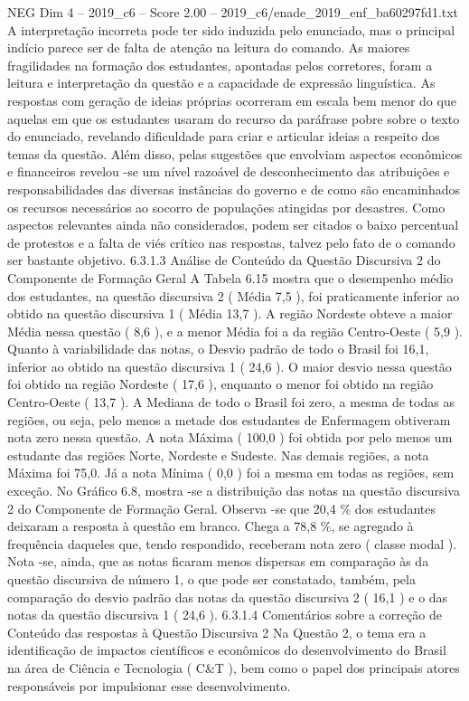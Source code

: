 \begin{textsample}{NEG Dim 4 – 2019\_c6 – Score 2.00 – 2019\_c6/enade\_2019\_enf\_ba60297fd1.txt}
A interpretação incorreta pode ter sido induzida pelo enunciado, mas o principal indício parece ser de falta de atenção na leitura do comando.
As maiores fragilidades na formação dos estudantes, apontadas pelos corretores, foram a leitura e interpretação da questão e a capacidade de expressão linguística.
As respostas com geração de ideias próprias ocorreram em escala bem menor do que aquelas em que os estudantes usaram do recurso da paráfrase pobre sobre o texto do enunciado, revelando dificuldade para criar e articular ideias a respeito dos temas da questão.
Além disso, pelas sugestões que envolviam aspectos econômicos e financeiros revelou -se um nível razoável de desconhecimento das atribuições e responsabilidades das diversas instâncias do governo e de como são encaminhados os recursos necessários ao socorro de populações atingidas por desastres.
Como aspectos relevantes ainda não considerados, podem ser citados o baixo percentual de protestos e a falta de viés crítico nas respostas, talvez pelo fato de o comando ser bastante objetivo. 6.3.1.3 Análise de Conteúdo da Questão Discursiva 2 do Componente de Formação Geral A Tabela 6.15 mostra que o desempenho médio dos estudantes, na questão discursiva 2 ( Média 7,5 ), foi praticamente inferior ao obtido na questão discursiva 1 ( Média 13,7 ).
A região Nordeste obteve a maior Média nessa questão ( 8,6 ), e a menor Média foi a da região Centro-Oeste ( 5,9 ).
Quanto à variabilidade das notas, o Desvio padrão de todo o Brasil foi 16,1, inferior ao obtido na questão discursiva 1 ( 24,6 ).
O maior desvio nessa questão foi obtido na região Nordeste ( 17,6 ), enquanto o menor foi obtido na região Centro-Oeste ( 13,7 ).
A Mediana de todo o Brasil foi zero, a mesma de todas as regiões, ou seja, pelo menos a metade dos estudantes de Enfermagem obtiveram nota zero nessa questão.
A nota Máxima ( 100,0 ) foi obtida por pelo menos um estudante das regiões Norte, Nordeste e Sudeste.
Nas demais regiões, a nota Máxima foi 75,0.
Já a nota Mínima ( 0,0 ) foi a mesma em todas as regiões, sem exceção.
No Gráfico 6.8, mostra -se a distribuição das notas na questão discursiva 2 do Componente de Formação Geral.
Observa -se que 20,4 \% dos estudantes deixaram a resposta à questão em branco.
Chega a 78,8 \%, se agregado à frequência daqueles que, tendo respondido, receberam nota zero ( classe modal ).
Nota -se, ainda, que as notas ficaram menos dispersas em comparação às da questão discursiva de número 1, o que pode ser constatado, também, pela comparação do desvio padrão das notas da questão discursiva 2 ( 16,1 ) e o das notas da questão discursiva 1 ( 24,6 ). 6.3.1.4 Comentários sobre a correção de Conteúdo das respostas à Questão Discursiva 2 Na Questão 2, o tema era a identificação de impactos científicos e econômicos do desenvolvimento do Brasil na área de Ciência e Tecnologia ( C\&T ), bem como o papel dos principais atores responsáveis por impulsionar esse desenvolvimento.

\end{textsample}

